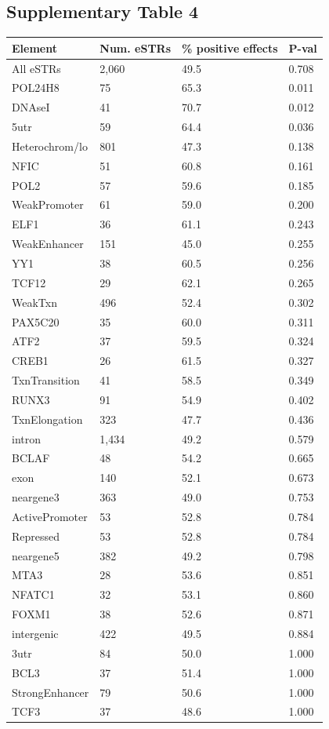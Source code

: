 \subsection{Supplementary Table 4}
\label{tab:estrsuptab4}
\begin{table}[h!]
\begin{tabular}{l|l|l|l}
Element & Num. eSTRs & \% positive effects & P-val \\
\hline
All eSTRs & 2,060 & 49.5 & 0.708 \\
\hline
POL24H8 & 75 & 65.3 & 0.011 \\
DNAseI & 41 & 70.7 & 0.012 \\
5utr & 59 & 64.4 & 0.036 \\
Heterochrom/lo & 801 & 47.3 & 0.138 \\
NFIC & 51 & 60.8 & 0.161 \\
POL2 & 57 & 59.6 & 0.185 \\
WeakPromoter & 61 & 59.0 & 0.200 \\
ELF1 & 36 & 61.1 & 0.243 \\
WeakEnhancer & 151 & 45.0 & 0.255 \\
YY1 & 38 & 60.5 & 0.256 \\
TCF12 & 29 & 62.1 & 0.265 \\
WeakTxn & 496 & 52.4 & 0.302 \\
PAX5C20 & 35 & 60.0 & 0.311 \\
ATF2 & 37 & 59.5 & 0.324 \\
CREB1 & 26 & 61.5 & 0.327 \\
TxnTransition & 41 & 58.5 & 0.349 \\
RUNX3 & 91 & 54.9 & 0.402 \\
TxnElongation & 323 & 47.7 & 0.436 \\
intron & 1,434 & 49.2 & 0.579 \\
BCLAF & 48 & 54.2 & 0.665 \\
exon & 140 & 52.1 & 0.673 \\
neargene3 & 363 & 49.0 & 0.753 \\
ActivePromoter & 53 & 52.8 & 0.784 \\
Repressed & 53 & 52.8 & 0.784 \\
neargene5 & 382 & 49.2 & 0.798 \\
MTA3 & 28 & 53.6 & 0.851 \\
NFATC1 & 32 & 53.1 & 0.860 \\
FOXM1 & 38 & 52.6 & 0.871 \\
intergenic & 422 & 49.5 & 0.884 \\
3utr & 84 & 50.0 & 1.000 \\
BCL3 & 37 & 51.4 & 1.000 \\
StrongEnhancer & 79 & 50.6 & 1.000 \\
TCF3 & 37 & 48.6 & 1.000 \\
\hline
\end{tabular}
\end{table}
